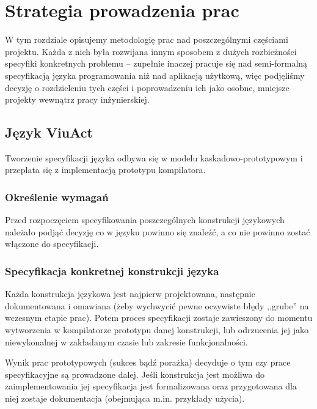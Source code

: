 \chapter{Strategia prowadzenia prac}
\label{strategia_prac}

W tym rozdziale opisujemy metodologię prac nad poszczególnymi częściami projektu. Każda z nich była rozwijana
innym sposobem z dużych rozbieżności specyfiki konkretnych problemu -- zupełnie inaczej pracuje się nad
semi-formalną specyfikacją języka programowania niż nad aplikacją użytkową, więc podjęliśmy decyzję o
rozdzieleniu tych części i poprowadzeniu ich jako osobne, mniejsze projekty wewnątrz pracy inżynierskiej.

\section{Język ViuAct}


Tworzenie specyfikacji języka odbywa się w modelu kaskadowo-prototypowym i przeplata się z implementacją
prototypu kompilatora.

\subsection{Określenie wymagań}

Przed rozpoczęciem specyfikowania poszczególnych konstrukcji językowych należało podjąć decyzję co w języku
powinno się znaleźć, a co nie powinno zostać włączone do specyfikacji.

\subsection{Specyfikacja konkretnej konstrukcji języka}

Każda konstrukcja językowa jest najpierw projektowana, następnie dokumentowana i omawiana (żeby wychwycić
pewne oczywiste błędy ,,grube'' na wczesnym etapie prac). Potem proces specyfikacji zostaje zawieszony do
momentu wytworzenia w kompilatorze prototypu danej konstrukcji, lub odrzucenia jej jako niewykonalnej w
zakładanym czasie lub zakresie funkcjonalności.

Wynik prac prototypowych (sukces bądź porażka) decyduje o tym czy prace specyfikacyjne są prowadzone dalej.
Jeśli konstrukcja jest możliwa do zaimplementowania jej specyfikacja jest formalizowana oraz przygotowana dla
niej zostaje dokumentacja (obejmująca m.in. przykłady użycia).

